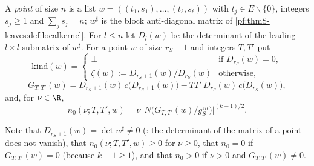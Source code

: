 \begin{definition}\label{pf:thmS-leaves:def:points}
A \emph{point} of size $n$ is a list $w=((t_1,s_1),\dots,(t_\ell,s_\ell))$ with $t_j\in E\smallsetminus\{0\}$, integers
$s_j\ge1$ and $\sum_js_j=n$; $w^\sharp$ is the block anti-diagonal matrix of \cref{pf:thmS-leaves:def:localkernel}.
For $l\le n$ let $D_l(w)$ be the determinant of the leading $l\times l$ submatrix of $w^\sharp$. For a point $w$
of size $r_S+1$ and integers $T,T'$ put
\[
\mathrm{kind}(w)=\begin{cases}\bot&\text{if }D_{r_S}(w)=0,\\ \zeta(w):=D_{r_S+1}(w)/D_{r_S}(w)&\text{otherwise,}\end{cases}
\]
\[
G_{T,T'}(w)=D_{r_S+1}(w)\,c\bigl(D_{r_S+1}(w)\bigr)-TT'\,D_{r_S}(w)\,c\bigl(D_{r_S}(w)\bigr),
\]
and, for $\nu\in\R$,
\begin{equation}\label{pf:thmS-leaves:eq:n0}
n_0(\nu;T,T',w)=\nu\,\bigl|N\bigl(G_{T,T'}(w)/g_S^{\,m}\bigr)\bigr|^{(k-1)/2}.
\end{equation}
\end{definition}

Note that $D_{r_S+1}(w)=\det w^\sharp\ne0$ (: the determinant of
the matrix of a point does not vanish), that $n_0(\nu;T,T',w)\ge0$ for $\nu\ge0$, that $n_0=0$ if $G_{T,T'}(w)=0$
(because $k-1\ge1$), and that $n_0>0$ if $\nu>0$ and $G_{T,T'}(w)\ne0$.

